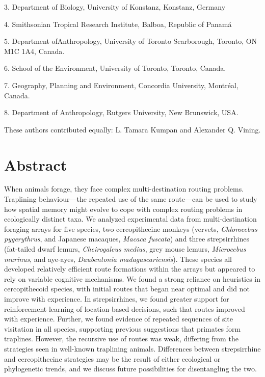\documentclass[twoside,12pt,final]{ucthesis-CA2012}
\begin{document}
\begin{ucmainmatter}
\begin{scriptsize}
3.  Department of Biology, University of Konstanz, Konstanz, Germany

4.  Smithsonian Tropical Research Institute, Balboa, Republic of Panamá

5.  Department ofAnthropology, University of Toronto Scarborough, Toronto, ON M1C 1A4, Canada. 

6. School of the Environment, University of Toronto, Toronto, Canada. 

7. Geography, Planning and Environment, Concordia University, Montréal, Canada. 

8. Department of Anthropology, Rutgers University, New Brunswick, USA. 

\dag These authors contributed equally: L. Tamara
Kumpan and Alexander Q. Vining.
\par
\end{scriptsize}
\hypertarget{abstract}{%
\section{Abstract}\label{abstract}}

When animals forage, they face complex multi-destination routing problems. Traplining behaviour---the repeated use of the same route---can be used to study how spatial memory might evolve to cope with complex routing problems in ecologically distinct taxa. We analyzed experimental data from multi-destination foraging arrays for five species, two cercopithecine monkeys (vervets, \emph{Chlorocebus pygerythrus}, and Japanese macaques, \emph{Macaca fuscata}) and three strepsirrhines (fat-tailed dwarf lemurs, \emph{Cheirogaleus medius}, grey mouse lemurs, \emph{Microcebus murinus}, and aye-ayes, \emph{Daubentonia madagascariensis}). These species all developed relatively efficient route formations within the arrays but appeared to rely on variable cognitive mechanisms. We found a strong reliance on heuristics in cercopithecoid species, with initial routes that began near optimal and did not improve with experience. In strepsirrhines, we found greater support for reinforcement learning of location-based decisions, such that routes improved with experience. Further, we found evidence of repeated sequences of site visitation in all species, supporting previous suggestions that primates form traplines. However, the recursive use of routes was weak, differing from the strategies seen in well-known traplining animals. Differences between strepsirrhine and cercopithecine strategies may be the result of either ecological or phylogenetic trends, and we discuss future possibilities for disentangling the two.


\end{ucmainmatter}
\end{document}
